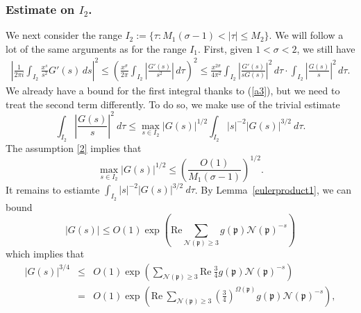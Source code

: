 \documentclass[11pt]{amsart}
\theoremstyle{definition}
\newcommand{\NN}{{\mathcal N}}
\newcommand{\mf}{\mathfrak}
\begin{document}
  \subsubsection{Estimate on $I_{2}$.}
We next consider the range $I_{2}:=\{ \tau : M_{1}(\sigma-1)<\vert\tau\vert\leq M_{2}\}$. We will follow a lot of the same arguments as for the range $I_1$. First, given $1<\sigma<2$, we still have
  \begin{equation}\label{bdnd1}
    \begin{split}
       \left|\frac{1}{2\pi i}\int_{I_{2}}\frac{x^{s}}{s^{2}}G'(s)\,ds\right|^{2}
       \leq \left(\frac{x^{\sigma}}{2\pi}\int_{I_{2}}\left|\frac{G'(s)}{s^{2}}\right|\,d\tau\right)^{2}
       \leq  \frac{x^{2\sigma}}{4\pi^{2}}\int_{I_{2}}\left|\frac{G'(s)}{s G(s)}\right|^{2}\,d\tau\cdot \int_{I_{2}}\left|\frac{G(s)}{s}\right|^{2}\,d\tau.
    \end{split}
 \end{equation}
We already have a bound for the first integral thanks to (\ref{a3}),
but we need to treat the second term differently.
To do so, we make use of the trivial estimate
\begin{equation}\label{bdnd2}
   \int_{I_2} \left| \frac{G(s)}{s} \right|^2 \ d\tau \leq \max_{s\in I_2} |G(s)|^{1/2} \int_{I_2} |s|^{-2} |G(s)|^{3/2} \ d\tau.
\end{equation}
The assumption \eqref{2}  implies that
\begin{equation}\label{bdnd3}
    \max_{s\in I_2} |G(s)|^{1/2} \leq \left(\frac{O(1)}{M_{1}(\sigma-1)}\right)^{1/2}.
\end{equation}
It remains to estiamte $\int_{I_2} |s|^{-2} |G(s)|^{3/2} \ d\tau$.
By Lemma~\ref{eulerproduct1}, we can bound
\[
|G(s)| \leq O(1) \exp\left(\text{Re} \sum_{ \NN(\mf p)\geq 3} g(\mf p)\NN(\mf p)^{-s}\right)
\]
which implies that
\begin{eqnarray*}
    |G(s)|^{3/4} & \leq & O(1)  \exp\left(\sum_{\NN(\mf p)\geq 3} \text{Re} \ \frac{3}{4}g(\mf p)\NN(\mf p)^{-s}\right) \\ 
    & = & O(1) \exp\left(\text{Re} \ \sum_{\NN(\mf p)\geq 3} \left(\frac{3}{4}\right)^{\Omega(\mf p)}g(\mf p)\NN(\mf p)^{-s}\right),
\end{eqnarray*}
\end{document}

